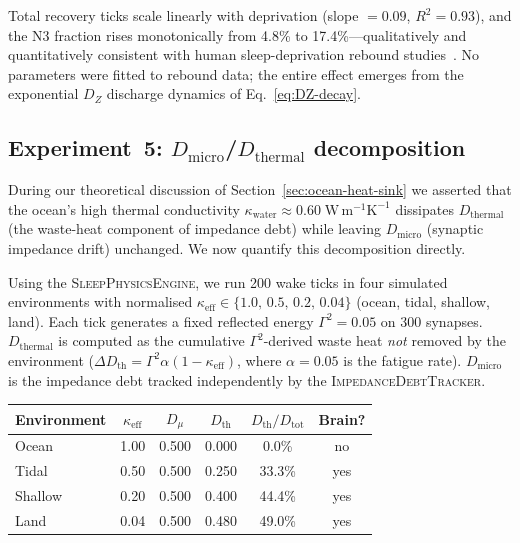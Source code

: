 ﻿\documentclass[aps,pre,twocolumn,superscriptaddress,floatfix]{revtex4-2}
\begin{document}
Total recovery ticks scale linearly with deprivation
(slope $= 0.09$, $R^2 = 0.93$),
and the N3 fraction rises monotonically from 4.8\%
to 17.4\%---qualitatively and quantitatively consistent
with human sleep-deprivation rebound studies~\cite{Borbely1982}.
No parameters were fitted to rebound data;
the entire effect emerges from the exponential
$D_Z$ discharge dynamics of Eq.~\eqref{eq:DZ-decay}.


\subsection{Experiment~5: $D_{\mathrm{micro}}$/$D_{\mathrm{thermal}}$ decomposition}
\label{sec:exp5}

During our theoretical discussion of Section~\ref{sec:ocean-heat-sink}
we asserted that the ocean's high thermal conductivity
$\kappa_{\mathrm{water}} \approx 0.60\;\mathrm{W\,m^{-1}K^{-1}}$
dissipates $D_{\mathrm{thermal}}$ (the waste-heat component of
impedance debt) while leaving $D_{\mathrm{micro}}$
(synaptic impedance drift) unchanged.
We now quantify this decomposition directly.

Using the \textsc{SleepPhysicsEngine},
we run 200 wake ticks in four simulated environments
with normalised $\kappa_{\mathrm{eff}} \in \{1.0,\,0.5,\,0.2,\,0.04\}$
(ocean, tidal, shallow, land).
Each tick generates a fixed reflected energy
$\Gamma^2 = 0.05$ on 300 synapses.
$D_{\mathrm{thermal}}$ is computed as the cumulative
$\Gamma^2$-derived waste heat \emph{not} removed by the
environment ($\Delta D_{\mathrm{th}} = \Gamma^2 \alpha (1 - \kappa_{\mathrm{eff}})$,
where $\alpha = 0.05$ is the fatigue rate).
$D_{\mathrm{micro}}$ is the impedance debt tracked
independently by the \textsc{ImpedanceDebtTracker}.

\begin{center}
\begin{tabular}{lccccc}
\hline
Environment & $\kappa_{\mathrm{eff}}$ & $D_{\mu}$ & $D_{\mathrm{th}}$ & $D_{\mathrm{th}}/D_{\mathrm{tot}}$ & Brain? \\
\hline
Ocean   & 1.00 & 0.500 & 0.000 &  0.0\% & no  \\
Tidal   & 0.50 & 0.500 & 0.250 & 33.3\% & yes \\
Shallow & 0.20 & 0.500 & 0.400 & 44.4\% & yes \\
Land    & 0.04 & 0.500 & 0.480 & 49.0\% & yes \\
\hline
\end{tabular}
\end{center}
\end{document}
